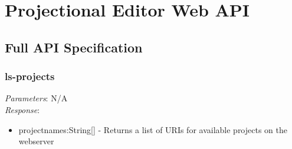 %
%
%
%
%
%
%
%

\section{Projectional Editor Web API}
\subsection{Full API Specification}\label{fullApiSpec}
\subsubsection{ls-projects}

\emph{Parameters}: N/A
\\
\emph{Response}: 
\begin{itemize}
\item projectnames:String[] - Returns a list of URIs for available projects on the webserver
\end{itemize} 

